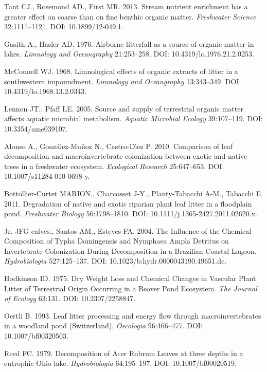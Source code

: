 \documentclass[12pt,letter]{article}
\begin{document}
\label{csl:49}Tant CJ., Rosemond AD., First MR. 2013. {Stream nutrient enrichment has a greater effect on coarse than on fine benthic organic matter}. \textit{Freshwater Science} 32:1111–1121. DOI: 10.1899/12-049.1.

\label{csl:50}Gasith A., Hasler AD. 1976. {Airborne litterfall as a source of organic matter in lakes}. \textit{Limnology and Oceangraphy} 21:253–258. DOI: 10.4319/lo.1976.21.2.0253.

\label{csl:51}McConnell WJ. 1968. {Limnological effects of organic extracts of litter in a southwestern impoundment}. \textit{Limnology and Oceangraphy} 13:343–349. DOI: 10.4319/lo.1968.13.2.0343.

\label{csl:52}Lennon JT., Pfaff LE. 2005. {Source and supply of terrestrial organic matter affects aquatic microbial metabolism}. \textit{Aquatic Microbial Ecology} 39:107–119. DOI: 10.3354/ame039107.

\label{csl:53}Alonso A., Gonz{\'{a}}lez-Mu{\~{n}}oz N., Castro-D{\'{\i}}ez P. 2010. {Comparison of leaf decomposition and macroinvertebrate colonization between exotic and native trees in a freshwater ecosystem}. \textit{Ecological Research} 25:647–653. DOI: 10.1007/s11284-010-0698-y.

\label{csl:54}Bottollier-Curtet MARION., Charcosset J-Y., Planty-Tabacchi A-M., Tabacchi E. 2011. {Degradation of native and exotic riparian plant leaf litter in a floodplain pond}. \textit{Freshwater Biology} 56:1798–1810. DOI: 10.1111/j.1365-2427.2011.02620.x.

\label{csl:55}Jr. JFG calves., Santos AM., Esteves FA. 2004. {The Influence of the Chemical Composition of Typha Domingensis and Nymphaea Ampla Detritus on Invertebrate Colonization During Decomposition in a Brazilian Coastal Lagoon}. \textit{Hydrobiologia} 527:125–137. DOI: 10.1023/b:hydr.0000043190.49651.dc.

\label{csl:56}Hodkinson ID. 1975. {Dry Weight Loss and Chemical Changes in Vascular Plant Litter of Terrestrial Origin Occurring in a Beaver Pond Ecosystem}. \textit{The Journal of Ecology} 63:131. DOI: 10.2307/2258847.

\label{csl:57}Oertli B. 1993. {Leaf litter processing and energy flow through macroinvertebrates in a woodland pond (Switzerland)}. \textit{Oecologia} 96:466–477. DOI: 10.1007/bf00320503.

\label{csl:58}Reed FC. 1979. {Decomposition of Acer Rubrum Leaves at three depths in a eutrophic Ohio lake}. \textit{Hydrobiologia} 64:195–197. DOI: 10.1007/bf00020519.
\end{document}
